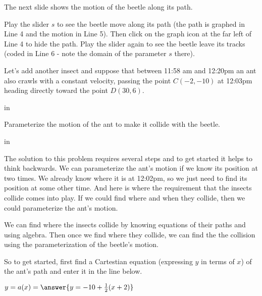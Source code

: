 \documentclass{ximera}
\newcommand{\pskip}{\vskip 0.1 in}
\begin{document}
The next slide shows the motion of the beetle along its path.

\begin{exploration}\label{exp:pc1b}
Play the slider $s$ to see the beetle move along its path (the path is graphed in Line 4 and the motion in Line 5). Then click on the graph icon at the far left of Line 4 to hide the path. Play the slider again to see the beetle leave its tracks (coded in Line 6 - note the domain of the parameter $s$ there).
 
 
\begin{onlineOnly}
    \begin{center}
\end{center}
\end{onlineOnly}
\end{exploration}


Let's add another insect and suppose that between 11:58 am and 12:20pm an ant also crawls with a constant velocity, passing the point $C(-2,-10)$ at 12:03pm heading directly toward the point $D(30,6)$.

\pskip

 Parameterize the motion of the ant to make it collide with the beetle.

\pskip

 The solution to this problem requires several steps and to get started it helps to think backwards. We can parameterize the ant's motion if we know its position at two times. We already know where it is at 12:02pm, so we just need to find its position at some other time. And here is where the requirement that the insects collide comes into play. If we could find where and when they collide, then we could parameterize the ant's motion.

We can find where the insects collide by knowing equations of their paths and using algebra. Then once we find where they collide, we can find the the collision using the parameterization of the beetle's motion.

So to get started, first find a Cartestian equation (expressing $y$ in terms of $x$) of the ant's path and enter it in the line below.

\begin{question}  
         $ y=a(x) =  \answer{y=-10+\frac{1}{2}(x+2)}$  
    \end{question}
\end{document}
